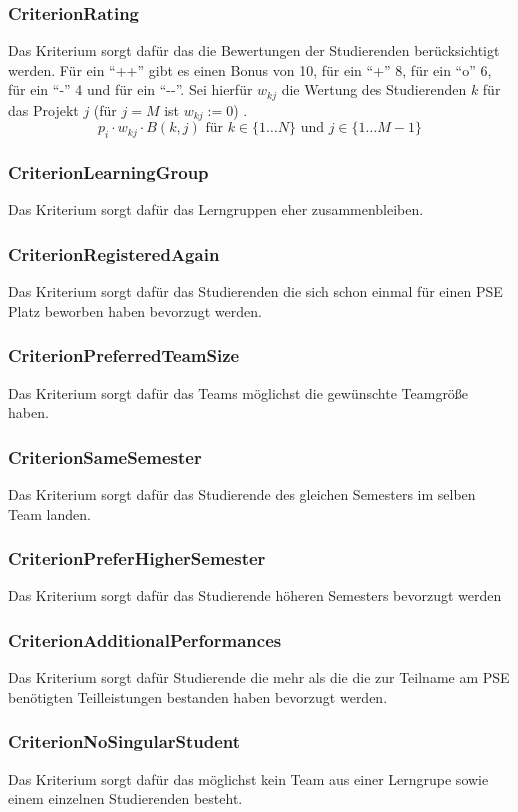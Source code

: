 \documentclass[parskip=full]{scrartcl}
\begin{document}
\subsubsection{CriterionRating}
Das Kriterium sorgt dafür das die Bewertungen der Studierenden berücksichtigt
werden. Für ein \enquote{++} gibt es einen Bonus von 10, für ein \enquote{+} 8,
für ein \enquote{o} 6, für ein \enquote{-} 4 und für ein \enquote{-{}-}. Sei
hierfür $w_{kj}$ die Wertung des Studierenden $k$ für das Projekt $j$ (für $j =
M$ ist $w_{kj} := 0$) .
\begin{equation*}
p_i \cdot w_{kj} \cdot B(k,j) \text{ für } k \in \{ 1\ldots N \} \text{ und }j
\in \{ 1\ldots M -1 \}
\end{equation*}

\subsubsection{CriterionLearningGroup}
Das Kriterium sorgt dafür das Lerngruppen eher zusammenbleiben.
\subsubsection{CriterionRegisteredAgain}
Das Kriterium sorgt dafür das Studierenden die sich schon einmal für einen PSE
Platz beworben haben bevorzugt werden.
\subsubsection{CriterionPreferredTeamSize}
Das Kriterium sorgt dafür das Teams möglichst die gewünschte Teamgröße haben.
\subsubsection{CriterionSameSemester}
Das Kriterium sorgt dafür das Studierende des gleichen Semesters im selben Team
landen.
\subsubsection{CriterionPreferHigherSemester}
Das Kriterium sorgt dafür das Studierende höheren Semesters bevorzugt werden
\subsubsection{CriterionAdditionalPerformances}
Das Kriterium sorgt dafür Studierende die mehr als die die zur Teilname am PSE
benötigten Teilleistungen bestanden haben bevorzugt werden.
\subsubsection{CriterionNoSingularStudent}
Das Kriterium sorgt dafür das möglichst kein Team aus einer Lerngrupe sowie
einem einzelnen Studierenden besteht.
\end{document}
